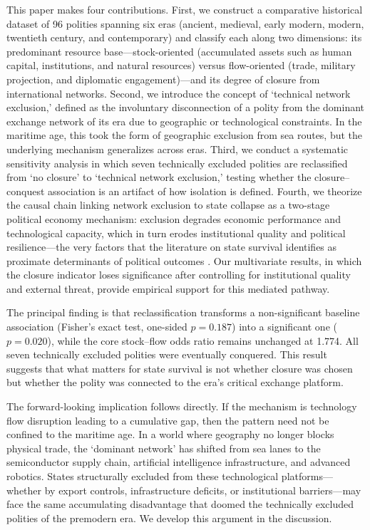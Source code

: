 \documentclass[pdflatex,sn-basic]{sn-jnl}
\theoremstyle{thmstyleone}%
\theoremstyle{thmstyletwo}%
\theoremstyle{thmstylethree}%
\begin{document}
This paper makes four contributions. First, we construct a comparative historical dataset of 96 polities spanning six eras (ancient, medieval, early modern, modern, twentieth century, and contemporary) and classify each along two dimensions: its predominant resource base---stock-oriented (accumulated assets such as human capital, institutions, and natural resources) versus flow-oriented (trade, military projection, and diplomatic engagement)---and its degree of closure from international networks. Second, we introduce the concept of `technical network exclusion,' defined as the involuntary disconnection of a polity from the dominant exchange network of its era due to geographic or technological constraints. In the maritime age, this took the form of geographic exclusion from sea routes, but the underlying mechanism generalizes across eras. Third, we conduct a systematic sensitivity analysis in which seven technically excluded polities are reclassified from `no closure' to `technical network exclusion,' testing whether the closure--conquest association is an artifact of how isolation is defined. Fourth, we theorize the causal chain linking network exclusion to state collapse as a two-stage political economy mechanism: exclusion degrades economic performance and technological capacity, which in turn erodes institutional quality and political resilience---the very factors that the literature on state survival identifies as proximate determinants of political outcomes \citep{BesleyPersson2011, AcemogluRobinson2006}. Our multivariate results, in which the closure indicator loses significance after controlling for institutional quality and external threat, provide empirical support for this mediated pathway.

The principal finding is that reclassification transforms a non-significant baseline association (Fisher's exact test, one-sided $p = 0.187$) into a significant one ($p = 0.020$), while the core stock--flow odds ratio remains unchanged at 1.774. All seven technically excluded polities were eventually conquered. This result suggests that what matters for state survival is not whether closure was chosen but whether the polity was connected to the era's critical exchange platform.

The forward-looking implication follows directly. If the mechanism is technology flow disruption leading to a cumulative gap, then the pattern need not be confined to the maritime age. In a world where geography no longer blocks physical trade, the `dominant network' has shifted from sea lanes to the semiconductor supply chain, artificial intelligence infrastructure, and advanced robotics. States structurally excluded from these technological platforms---whether by export controls, infrastructure deficits, or institutional barriers---may face the same accumulating disadvantage that doomed the technically excluded polities of the premodern era. We develop this argument in the discussion.
\end{document}
